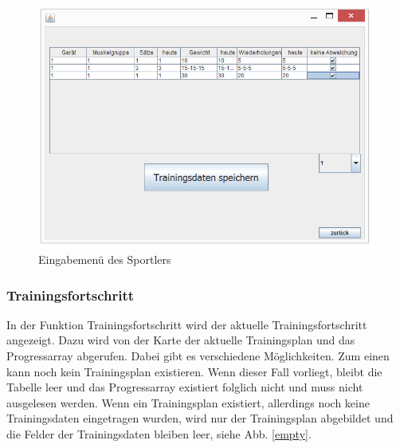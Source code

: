 \begin{figure}[h]
\includegraphics[width=1\hsize]{./images/sportler.png}
\caption{Eingabemenü des Sportlers}
\label{sportler}
\end{figure}
\newpage
\subsubsection*{Trainingsfortschritt}

In der Funktion Trainingsfortschritt wird der aktuelle Trainingsfortschritt angezeigt. Dazu wird von der Karte der aktuelle Trainingsplan und das Progressarray abgerufen. Dabei gibt es verschiedene Möglichkeiten. Zum einen kann noch kein Trainingsplan existieren. Wenn dieser Fall vorliegt, bleibt die Tabelle leer und das Progressarray existiert folglich nicht und muss nicht ausgelesen werden. Wenn ein Trainingsplan existiert, allerdings noch keine Trainingsdaten eingetragen wurden, wird nur der Trainingsplan abgebildet und die Felder der Trainingsdaten bleiben leer, siehe Abb. \ref{empty}.

